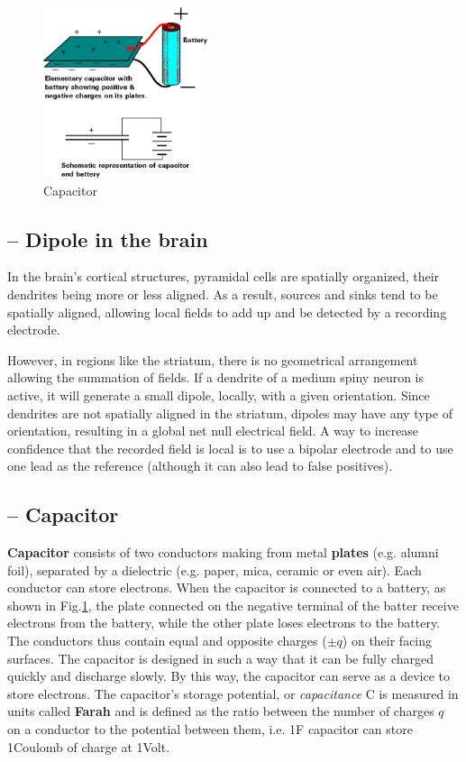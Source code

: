  \begin{figure}[htb]
    \centerline{\includegraphics[height=5cm]{./images/capacitor_battery.eps}}
    \caption{Capacitor}\label{fig:capacitor}
  \end{figure}

\subsection{-- Dipole in the brain}
\label{sec:dipole-in-brain}

In the brain's cortical structures, pyramidal cells are spatially organized,
their dendrites being more or less aligned. As a result, sources and sinks tend
to be spatially aligned, allowing local fields to add up and be detected by a
recording electrode.

However, in regions like the striatum, there is no geometrical arrangement
allowing the summation of fields.  If a dendrite of a medium spiny neuron is
active, it will generate a small dipole, locally, with a given orientation.
Since dendrites are not spatially aligned in the striatum, dipoles may have any
type of orientation, resulting in a global net null electrical field. A way to
increase confidence that the recorded field is local is to use a bipolar
electrode and to use one lead as the reference (although it can also lead to
false positives).


\subsection{-- Capacitor}
\label{sec:capacitor}

{\bf Capacitor} consists of two conductors making from metal
{\bf plates} (e.g. alumni foil), separated by a dielectric
(e.g. paper, mica, ceramic or even air). Each conductor can store
electrons.  When the capacitor is connected to a battery, as shown in
Fig.\ref{fig:capacitor}, the plate connected on the negative terminal
of the batter receive electrons from the battery, while the other
plate loses electrons to the battery.  The conductors thus contain
equal and opposite charges ($\pm q$) on their facing surfaces. The
capacitor is designed in such a way that it can be fully charged
quickly and discharge slowly. By this way, the capacitor can serve as
a device to store electrons.  The capacitor's storage potential, or
{\it capacitance} C is measured in units called {\bf Farah} and is
defined as the ratio between the number of charges $q$ on a conductor
to the potential between them, i.e. 1F capacitor can store 1Coulomb of
charge at 1Volt.

